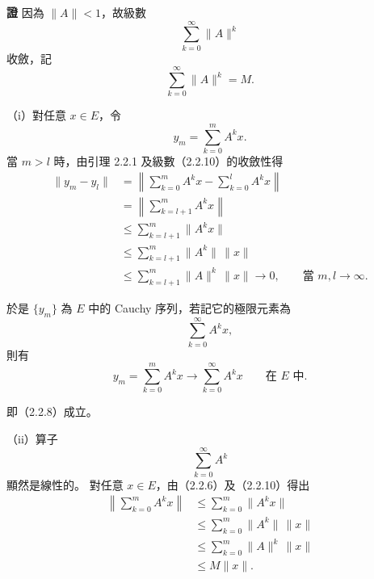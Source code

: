 \documentclass[11pt,a4paper,twoside]{article}
\newcommand{\pnum}[1]{%
    \makebox[0pt][r]{%
        \scriptsize\textbf{[#1]}\hspace{0.7em}%
    }%
}
\begin{document}
\noindent
\pnum{88}
\textbf{證}\quad
因為 $\|A\|<1$，故級數
\[
    \sum_{k=0}^{\infty}\|A\|^k
\]
收斂，記
\begin{equation}
    \sum_{k=0}^{\infty}\|A\|^k=M.
    \tag{2.2.10}
\end{equation}

\noindent
（i）對任意 $x\in E$，令
\[
    y_m
    =
    \sum_{k=0}^{m}A^k x.
\]
當 $m>l$ 時，由引理 2.2.1 及級數（2.2.10）的收斂性得
\[
    \begin{aligned}
        \|y_m-y_l\|
         & =
        \left\|
        \sum_{k=0}^{m}A^k x
        -
        \sum_{k=0}^{l}A^k x
        \right\|
        \\
         & =
        \left\|
        \sum_{k=l+1}^{m}A^k x
        \right\|
        \\
         & \le
        \sum_{k=l+1}^{m}
        \|A^k x\|
        \\
         & \le
        \sum_{k=l+1}^{m}
        \|A^k\|\,\|x\|
        \\
         & \le
        \sum_{k=l+1}^{m}
        \|A\|^k\,\|x\|
        \longrightarrow 0,
        \qquad
        \text{當 }m,l\to\infty.
    \end{aligned}
\]

於是 $\{y_m\}$ 為 $E$ 中的 Cauchy 序列，若記它的極限元素為
\[
    \sum_{k=0}^{\infty}A^k x,
\]
則有
\begin{equation}
    y_m
    =
    \sum_{k=0}^{m}A^k x
    \longrightarrow
    \sum_{k=0}^{\infty}A^k x
    \qquad
    \text{在 }E\text{ 中}.
    \tag{2.2.11}
\end{equation}

\newpage

\noindent
\pnum{89}
即（2.2.8）成立。

\noindent
（ii）算子
\[
    \sum_{k=0}^{\infty}A^k
\]
顯然是線性的。
對任意 $x\in E$，由（2.2.6）及（2.2.10）得出
\begin{equation}
    \begin{aligned}
        \left\|
        \sum_{k=0}^{m}A^k x
        \right\|
         & \le
        \sum_{k=0}^{m}
        \|A^k x\|
        \\
         & \le
        \sum_{k=0}^{m}
        \|A^k\|\,\|x\|
        \\
         & \le
        \sum_{k=0}^{m}
        \|A\|^k\,\|x\|
        \\
         & \le
        M\|x\|.
    \end{aligned}
    \tag{2.2.12}
\end{equation}
\end{document}
